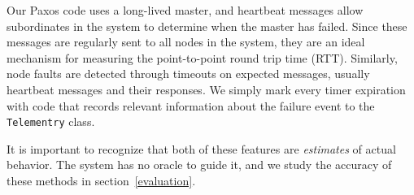 Our Paxos code uses a long-lived master, and heartbeat messages allow subordinates in the system to determine when the master has failed.
Since these messages are regularly sent to all nodes in the system, they are an ideal mechanism for measuring the point-to-point round trip time (RTT).
Similarly, node faults are detected through timeouts on expected messages, usually heartbeat messages and their responses.
We simply mark every timer expiration with code that records relevant information about the failure event to the \texttt{Telementry} class.

It is important to recognize that both of these features are \emph{estimates} of actual behavior.
The system has no oracle to guide it, and we study the accuracy of these methods in section~\ref{evaluation}.




